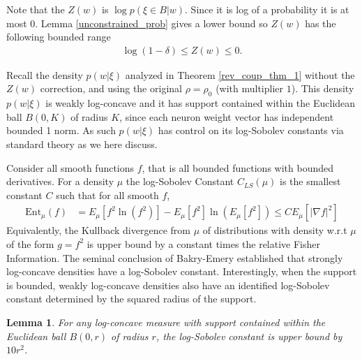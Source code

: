 \documentclass{article}
\numberwithin{equation}{section}
\theoremstyle{Lemma}
\newtheorem{lemma}{Lemma}
\theoremstyle{Corollary}
\theoremstyle{Theorem}
\theoremstyle{Remark}
\begin{document}
Note that the $Z(w)$ is $\log p(\xi \in B|w)$. Since it is log of a probability it is at most 0. Lemma \ref{unconstrained_prob} gives a lower bound so $Z(w)$ has the following bounded range
\begin{align}
\log \left( 1-\delta\right) \leq Z(w) \leq 0.
\end{align}

Recall the density $p(w|\xi)$ analyzed in Theorem \ref{rev_coup_thm_1} without the $Z(w)$ correction, and using the original $\rho=\rho_0$ (with multiplier $1$). This density $p(w|\xi)$ is weakly log-concave  and it has support contained within the Euclidean ball $B(0,K)$ of radius $K$, since each neuron weight vector has independent bounded 1 norm. As such $p(w|\xi)$ has control on its log-Sobolev constants via standard theory as we here discuss.

Consider all smooth functions $f$, that is all bounded functions with bounded derivatives. For a density $\mu$ the log-Sobolev Constant $C_{LS}(\mu)$ is the smallest constant $C$ such that for all smooth $f$,
\begin{align}
\text{Ent}_{\mu}(f)&= E_{\mu}[f^{2}\ln(f^{2})]- E_{\mu}[f^{2}]\ln(E_{\mu}[f^{2}]) \leq C E_{\mu}[|\nabla f|^{2}] 
\end{align}
Equivalently, the Kullback divergence from $\mu$ of distributions with density w.r.t $\mu$ of the form $g = f^{2}$ is upper bound by a constant times the relative Fisher Information.  The seminal conclusion of Bakry-Emery \cite{bakry1985diffusions,bakry2014analysis} established that strongly log-concave densities have a log-Sobolev constant.  
Interestingly, when the support is bounded, weakly log-concave densities also have an identified log-Sobolev constant determined by the squared radius of the support.

\begin{lemma}\cite[Corollary 2.3]{bobkov1999isoperimetric}
For any log-concave measure with support contained within the Euclidean ball $B(0,r)$ of radius $r$, the log-Sobolev constant is upper bound by $10 r^{2}$.
\end{lemma}
\end{document}
